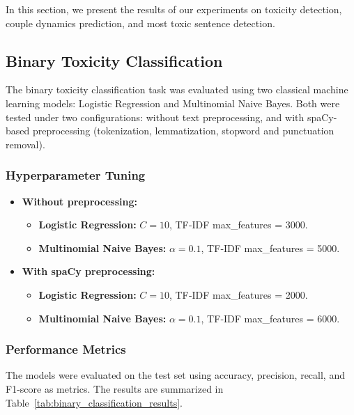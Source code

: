 \documentclass[conference]{IEEEtran}
\begin{document}
In this section, we present the results of our experiments on toxicity detection, couple dynamics prediction, and most toxic sentence detection.

\subsection{Binary Toxicity Classification}

The binary toxicity classification task was evaluated using two classical machine learning models: Logistic Regression and Multinomial Naive Bayes. Both were tested under two configurations: without text preprocessing, and with spaCy-based preprocessing (tokenization, lemmatization, stopword and punctuation removal).

\subsubsection{Hyperparameter Tuning}

\begin{itemize}
  \item \textbf{Without preprocessing:}
    \begin{itemize}
      \item \textbf{Logistic Regression:} $C = 10$, TF‑IDF max\_features = 3000.
      \item \textbf{Multinomial Naive Bayes:} $\alpha = 0.1$, TF‑IDF max\_features = 5000.
    \end{itemize}
  \item \textbf{With spaCy preprocessing:}
    \begin{itemize}
      \item \textbf{Logistic Regression:} $C = 10$, TF‑IDF max\_features = 2000.
      \item \textbf{Multinomial Naive Bayes:} $\alpha = 0.1$, TF‑IDF max\_features = 6000.
    \end{itemize}
\end{itemize}

\subsubsection{Performance Metrics}
\noindent

The models were evaluated on the test set using accuracy, precision, recall, and F1-score as metrics. The results are summarized in Table~\ref{tab:binary_classification_results}.
\end{document}
